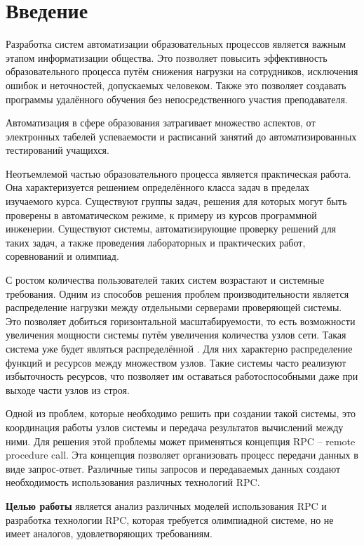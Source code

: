 \chapter*{Введение}
Разработка систем автоматизации образовательных процессов является важным этапом
информатизации общества. Это позволяет повысить эффективность образовательного
процесса путём снижения нагрузки на сотрудников, исключения ошибок и
неточностей, допускаемых человеком. Также это позволяет создавать программы
удалённого обучения без непосредственного участия преподавателя.

Автоматизация в сфере образования затрагивает множество аспектов,
от электронных табелей успеваемости и расписаний занятий до автоматизированных
тестирований учащихся.

Неотъемлемой частью образовательного процесса является практическая работа.
Она характеризуется решением определённого класса задач в пределах изучаемого
курса. Существуют группы задач, решения для которых могут быть проверены
в автоматическом режиме, к примеру из курсов программной инженерии.
Существуют системы, автоматизирующие проверку решений для таких задач,
а также проведения лабораторных и практических работ, соревнований и олимпиад.

С ростом количества пользователей таких систем возрастают и системные требования.
Одним из способов решения проблем производительности является
распределение нагрузки между отдельными серверами проверяющей системы.
Это позволяет добиться горизонтальной масштабируемости, то есть возможности
увеличения мощности системы путём увеличения количества узлов сети.
Такая система уже будет являться распределённой \cite{distributed}.
Для них характерно распределение функций и ресурсов между множеством узлов.
Такие системы часто реализуют избыточность ресурсов, что позволяет им
оставаться работоспособными даже при выходе части узлов из строя.

Одной из проблем, которые необходимо решить при создании такой системы,
это координация работы узлов системы и передача результатов вычислений
между ними. Для решения этой проблемы может применяться концепция RPC --
remote procedure call. Эта концепция позволяет организовать процесс передачи
данных в виде запрос-ответ. Различные типы запросов и передаваемых данных
создают необходимость использования различных технологий RPC.

\textbf{Целью работы} является анализ различных моделей использования RPC
и разработка технологии RPC, которая требуется олимпиадной системе, но не имеет
аналогов, удовлетворяющих требованиям.

